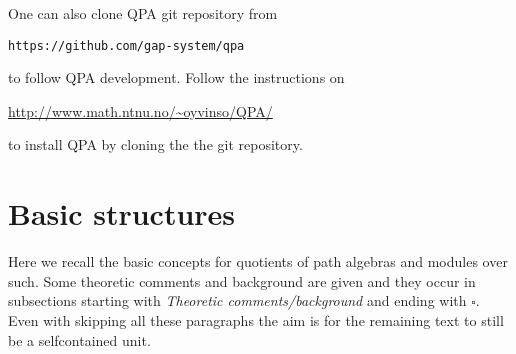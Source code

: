 \documentclass{amsart}
\theoremstyle{definition}
\theoremstyle{theoretic}
\begin{document}
One can also clone QPA git repository from
\begin{center}\texttt{https://github.com/gap-system/qpa}\end{center}
to follow QPA development. Follow the instructions on 
\begin{center}
\url{http://www.math.ntnu.no/~oyvinso/QPA/}
\end{center}
to install QPA by cloning the the git repository. 

\section{Basic structures}

Here we recall the basic concepts for quotients of path algebras and
modules over such.  Some theoretic comments and background are given
and they occur in subsections starting with \emph{Theoretic
  comments/background} and ending with $\square$.  Even with skipping
all these paragraphs the aim is for the remaining text to still be a
selfcontained unit.
\end{document}
